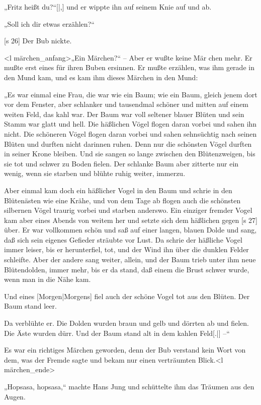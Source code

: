 „Fritz heißt du?“[|,] und er wippte ihn auf seinem
Knie auf und ab.

„Soll ich dir etwas erzählen?“

[s 26]
Der Bub nickte.

<l märchen_anfang>„Ein Märchen?“ – Aber er wußte keine Mär­
chen mehr. Er mußte erst eines für ihren Buben
ersinnen. Er mußte erzählen, was ihm gerade in
den Mund kam, und es kam ihm dieses Märchen
in den Mund:

„Es war einmal eine Frau, die war wie ein
Baum; wie ein Baum, gleich jenem dort vor dem
Fenster, aber schlanker und tausendmal schöner und
mitten auf einem weiten Feld, das kahl war. Der
Baum war voll seltener blauer Blüten und sein Stamm
war glatt und hell. Die häßlichen Vögel flogen daran
vorbei und sahen ihn nicht. Die schöneren Vögel
flogen daran vorbei und sahen sehnsüchtig nach seinen
Blüten und durften nicht darinnen ruhen. Denn nur die
schönsten Vögel durften in seiner Krone bleiben. Und
sie sangen so lange zwischen den Blütenzweigen, bis
sie tot und schwer zu Boden fielen. Der schlanke
Baum aber zitterte nur ein wenig, wenn sie starben
und blühte ruhig weiter, immerzu.

Aber einmal kam doch ein häßlicher Vogel in
den Baum und schrie in den Blütenästen wie eine
Krähe, und von dem Tage ab flogen auch die schönsten
silbernen Vögel traurig vorbei und starben anderswo.
Ein einziger fremder Vogel kam aber eines Abends
von weitem her und setzte sich dem häßlichen gegen­
[s 27]
über. Er war vollkommen schön und saß auf einer
langen, blauen Dolde und sang, daß sich sein eigenes
Gefieder sträubte vor Lust. Da schrie der häßliche
Vogel immer leiser, bis er herunterfiel, tot, und der
Wind ihn über die dunklen Felder schleifte. Aber
der andere sang weiter, allein, und der Baum trieb
unter ihm neue Blütendolden, immer mehr, bis er
da stand, daß einem die Brust schwer wurde, wenn
man in die Nähe kam.

Und eines [Morgen|Morgens] fiel auch der schöne Vogel
tot aus den Blüten. Der Baum stand leer.

Da verblühte er. Die Dolden wurden braun
und gelb und dörrten ab und fielen. Die Äste
wurden dürr. Und der Baum stand alt in dem
kahlen Feld[.|] –“

Es war ein richtiges Märchen geworden, denn
der Bub verstand kein Wort von dem, was der
Fremde sagte und bekam nur einen verträumten Blick.<l märchen_ende>

„Hopsasa, hopsasa,“ machte Hans Jung und
schüttelte ihm das Träumen aus den Augen.

